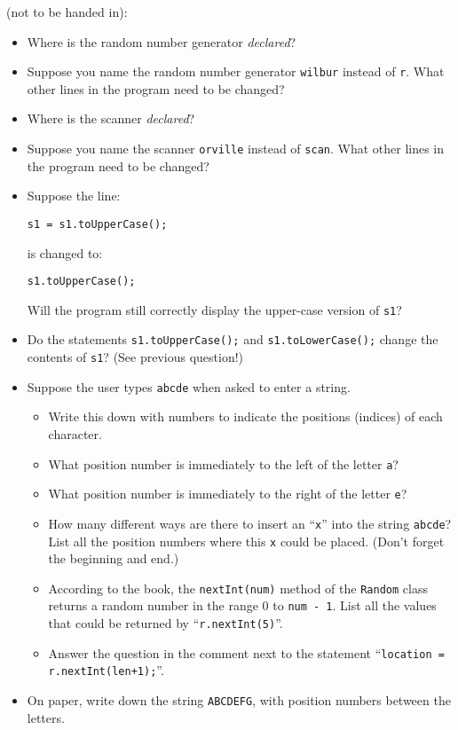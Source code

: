 (not to be handed in):
\begin{itemize}
\item Where is the random number generator {\em declared}?
\item Suppose you name the random number generator {\tt wilbur} instead of {\tt r}.
What other lines in the program need to be changed?
\item Where is the scanner {\em declared}?
\item Suppose you name the scanner {\tt orville} instead of {\tt scan}.
What other lines in the program need to be changed?
\item
Suppose the line:
\begin{center}
\verb$s1 = s1.toUpperCase();$
\end{center}
is changed to:
\begin{center}
\verb$s1.toUpperCase();$
\end{center}
Will the program still correctly display the upper-case version of {\tt s1}?
\item
Do the statements {\tt s1.toUpperCase();} and {\tt s1.toLowerCase();}
change the contents of {\tt s1}? (See previous question!)
\item
Suppose the user types {\tt abcde} when asked to enter a string.
\begin{itemize}
\item Write this down with numbers to indicate the positions (indices) of each character.
\item
What position number is immediately to the left of the letter {\tt a}?
\item
What position number is immediately to the right of the letter {\tt e}?
\item
How many different ways are there to insert an ``{\tt x}'' into the string
{\tt abcde}? List all the position numbers where this {\tt x} could be placed.
(Don't forget the beginning and end.)
\item
According to the book, the {\tt nextInt(num)} method of the {\tt Random}
class returns a random number in the range 0 to {\tt num - 1}.
List all the values that could be returned by ``{\tt r.nextInt(5)}''.
\item
Answer the question in the comment next to the statement ``\verb$location = r.nextInt(len+1);$''.
\end{itemize}
\item
On paper, write down the string {\tt ABCDEFG}, with position numbers
between the letters.

\end{itemize}
